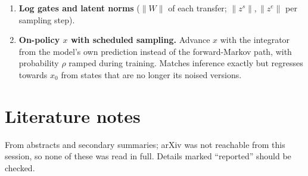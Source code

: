\documentclass[11pt,a4paper]{article}
\newcommand{\zs}{z^{s}}
\newcommand{\ze}{z^{e}}
\begin{document}
\begin{enumerate}
        pass on the ground-truth molecule. No gain $\Rightarrow$ the mechanism cannot
        use the channel. Large gain $\Rightarrow$ the model cannot yet produce good
        latents; spend on training.
  \item \textbf{Log gates and latent norms} ($\|W\|$ of each transfer; $\|\zs\|,\|\ze\|$
        per sampling step).
  \item \textbf{On-policy $x$ with scheduled sampling.} Advance $x$ with the integrator
        from the model's own prediction instead of the forward-Markov path, with
        probability $\rho$ ramped during training. Matches inference exactly but
        regresses towards $x_0$ from states that are no longer its noised versions.
\end{enumerate}

\section{Literature notes}

From abstracts and secondary summaries; arXiv was not reachable from this session, so
none of these was read in full. Details marked ``reported'' should be checked.
\end{document}
